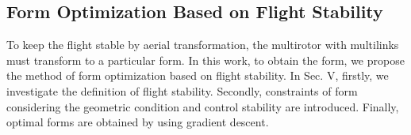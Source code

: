 \subsection{Form Optimization Based on Flight Stability}
To keep the flight stable by aerial transformation, the multirotor with multilinks must transform to a particular form. In this work, to obtain the form, we propose the method of form optimization based on flight stability. In Sec. V, firstly, we investigate the definition of flight stability. Secondly, constraints of form considering the geometric condition and control stability are introduced. Finally, optimal forms are obtained by using gradient descent.
